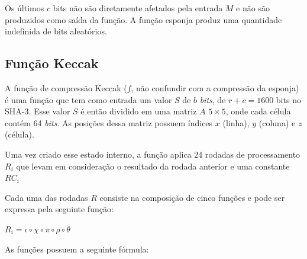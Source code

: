 Os últimos $c$ bits não são diretamente afetados pela entrada $M$ e não são
produzidos como saída da função. A função esponja produz uma quantidade
indefinida de bits aleatórios.

\subsection{Função Keccak}

A função de compressão Keccak ($f$, não confundir com a compressão da esponja)
é uma função que tem como entrada um valor $S$ de $b$ \textit{bits}, de
$r + c = 1600$ bits no SHA-3. Esse valor $S$ é então dividido em uma matriz $A$
$5 \times 5$, onde cada célula contém 64 \textit{bits}. As posições dessa
matriz possuem índices $x$ (linha), $y$ (coluna) e $z$ (célula).

Uma vez criado esse estado interno, a função aplica 24 rodadas de processamento
$R_{i}$ que levam em consideração o resultado da rodada anterior e uma
constante $RC_{i}$

Cada uma das rodadas $R$ consiste na composição de cinco funções e pode ser
expressa pela seguinte função:

\begin{center}
    $R_{i} = \iota \circ \chi \circ \pi \circ \rho \circ \theta$
\end{center}

As funções possuem a seguinte fórmula:

